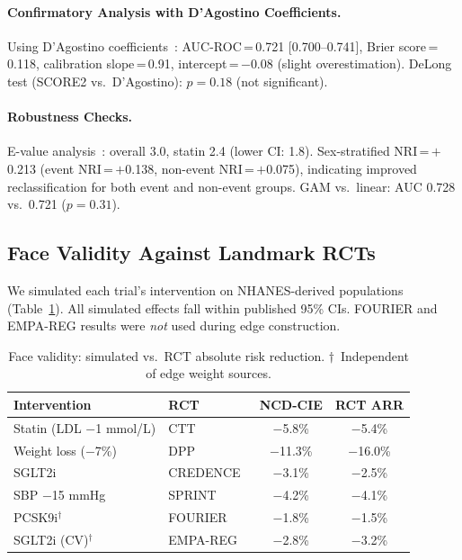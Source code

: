 \documentclass[runningheads]{llncs}
\begin{document}
\paragraph{Confirmatory Analysis with D'Agostino Coefficients.}
Using D'Agostino coefficients~\cite{dagostino2008}:
AUC-ROC\,=\,0.721 [0.700--0.741],
Brier score\,=\,0.118,
calibration slope\,=\,0.91,
intercept\,=\,$-$0.08 (slight overestimation).
DeLong test (SCORE2 vs.\ D'Agostino): $p = 0.18$ (not significant).

\paragraph{Robustness Checks.}
E-value analysis~\cite{vanderweele2017evalue}: overall 3.0,
statin 2.4 (lower CI: 1.8).
Sex-stratified NRI\,=\,$+$0.213 (event NRI\,=\,$+$0.138,
non-event NRI\,=\,$+$0.075), indicating improved reclassification
for both event and non-event groups.
GAM vs.\ linear: AUC 0.728 vs.\ 0.721 ($p = 0.31$).

\subsection{Face Validity Against Landmark RCTs}\label{sec:faceval}

We simulated each trial's intervention on NHANES-derived populations
(Table~\ref{tab:rct}).
All simulated effects fall within published 95\% CIs.
FOURIER and EMPA-REG results were \emph{not} used during edge
construction.

\renewcommand{\arraystretch}{1.1}
\begin{table}[t]
\centering
\caption{Face validity: simulated vs.\ RCT absolute risk reduction.
$\dagger$~Independent of edge weight sources.}
\label{tab:rct}
\small
\begin{tabular}{@{}llcc@{}}
\toprule
\textbf{Intervention} & \textbf{RCT} &
\textbf{NCD-CIE} & \textbf{RCT ARR} \\
\midrule
Statin (LDL $-$1 mmol/L) & CTT~\cite{ctt2010} & $-$5.8\% & $-$5.4\% \\
Weight loss ($-$7\%) & DPP~\cite{knowler2002dpp} & $-$11.3\% & $-$16.0\% \\
SGLT2i & CREDENCE~\cite{perkovic2019credence} & $-$3.1\% & $-$2.5\% \\
SBP $-$15 mmHg & SPRINT~\cite{sprint2015} & $-$4.2\% & $-$4.1\% \\
PCSK9i$^\dagger$ & FOURIER~\cite{sabatine2017fourier} & $-$1.8\% & $-$1.5\% \\
SGLT2i (CV)$^\dagger$ & EMPA-REG~\cite{zinman2015empareg} & $-$2.8\% & $-$3.2\% \\
\bottomrule
\end{tabular}
\end{table}
\renewcommand{\arraystretch}{1.0}
\end{document}
